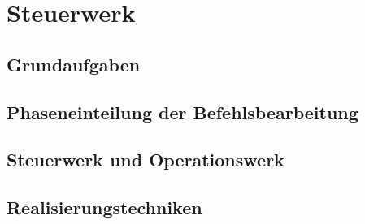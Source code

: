 
\section{Steuerwerk}

\subsection*{Grundaufgaben}
\subsection*{Phaseneinteilung der Befehlsbearbeitung}
\subsection*{Steuerwerk und Operationswerk}
\subsection*{Realisierungstechniken}

